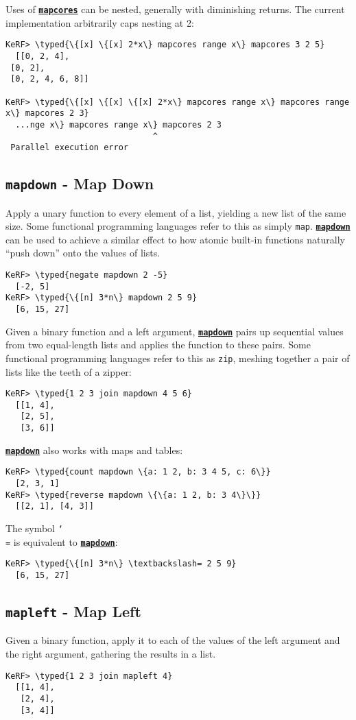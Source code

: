 \documentclass{article}
\newcommand{\typed}[1]{\textcolor{TealBlue}{#1}}
\newcommand{\primdefu}[3]{\subsection{\texttt{#1} - #2}\label{prim:#3}}
\newcommand{\primu}[2]{\hyperref[prim:#2]{\textbf{\texttt{#1}}}}
\newcommand{\combdef}[2]{\primdefu{#1}{#2}{#1}}
\newcommand{\comb}[1]{\primu{#1}{#1}}
\begin{document}
Uses of \comb{mapcores} can be nested, generally with diminishing returns. The current implementation arbitrarily caps nesting at 2:
\begin{Verbatim}
KeRF> \typed{\{[x] \{[x] 2*x\} mapcores range x\} mapcores 3 2 5}
  [[0, 2, 4], 
 [0, 2], 
 [0, 2, 4, 6, 8]]

KeRF> \typed{\{[x] \{[x] \{[x] 2*x\} mapcores range x\} mapcores range x\} mapcores 2 3}
  ...nge x\} mapcores range x\} mapcores 2 3
                              ^
 Parallel execution error
\end{Verbatim}

\combdef{mapdown}{Map Down}

Apply a unary function to every element of a list, yielding a new list of the same size. Some functional programming languages refer to this as simply \texttt{map}. \comb{mapdown} can be used to achieve a similar effect to how atomic built-in functions naturally ``push down'' onto the values of lists.

\begin{Verbatim}
KeRF> \typed{negate mapdown 2 -5}
  [-2, 5]
KeRF> \typed{\{[n] 3*n\} mapdown 2 5 9}
  [6, 15, 27]
\end{Verbatim}

Given a binary function and a left argument, \comb{mapdown} pairs up sequential values from two equal-length lists and applies the function to these pairs. Some functional programming languages refer to this as \texttt{zip}, meshing together a pair of lists like the teeth of a zipper:
\begin{Verbatim}
KeRF> \typed{1 2 3 join mapdown 4 5 6}
  [[1, 4], 
   [2, 5], 
   [3, 6]]
\end{Verbatim}

\comb{mapdown} also works with maps and tables:
\begin{Verbatim}
KeRF> \typed{count mapdown \{a: 1 2, b: 3 4 5, c: 6\}}
  [2, 3, 1]
KeRF> \typed{reverse mapdown \{\{a: 1 2, b: 3 4\}\}}
  [[2, 1], [4, 3]]
\end{Verbatim}

The symbol \texttt{\char`\\=} is equivalent to \comb{mapdown}:
\begin{Verbatim}
KeRF> \typed{\{[n] 3*n\} \textbackslash= 2 5 9}
  [6, 15, 27]
\end{Verbatim}

\combdef{mapleft}{Map Left}

Given a binary function, apply it to each of the values of the left argument and the right argument, gathering the results in a list.
\begin{Verbatim}
KeRF> \typed{1 2 3 join mapleft 4}
  [[1, 4], 
   [2, 4], 
   [3, 4]]
\end{Verbatim}
\end{document}
